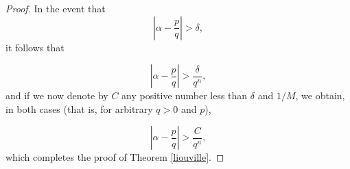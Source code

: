 \documentclass{article}
\begin{document}
\begin{proof}
In the event that 
\begin{equation*}
   \left | \alpha - \frac{p}{q} \right| > \delta ,
\end{equation*}
it follows that 

\begin{equation*}
   \left| \alpha - \frac{p}{q} \right| >  \frac{\delta}{q^n} ,
\end{equation*}
and if we now denote by $C$ any positive number less than $\delta$ and $1/M$,
we obtain, in both cases (that is, for arbitrary $q>0$ and $p$),

\begin{equation*}
   \left| \alpha - \frac{p}{q} \right| >  \frac{C}{q^n},
\end{equation*}
which completes the proof of Theorem \ref{liouville}.

\end{proof}
\end{document}
